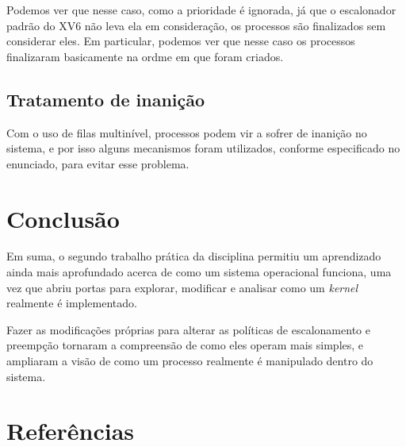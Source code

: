 \documentclass{article}
\begin{document}
Podemos ver que nesse caso, como a prioridade é ignorada, já que o escalonador
padrão do XV6 não leva ela em consideração, os processos são finalizados sem
considerar eles. Em particular, podemos ver que nesse caso os processos
finalizaram basicamente na ordme em que foram criados.

\subsection{Tratamento de inanição}

Com o uso de filas multinível, processos podem vir a sofrer de inanição no
sistema, e por isso alguns mecanismos foram utilizados, conforme especificado
no enunciado, para evitar esse problema.

\section{Conclusão}

Em suma, o segundo trabalho prática da disciplina
permitiu um aprendizado ainda mais aprofundado acerca de como um sistema
operacional funciona, uma vez que abriu portas para explorar, modificar e
analisar como um \textit{kernel} realmente é implementado.

Fazer as modificações próprias para alterar as políticas de escalonamento e
preempção tornaram a compreensão de como eles operam mais simples, e ampliaram
a visão de como um processo realmente é manipulado dentro do sistema.

\section{Referências}
\end{document}
